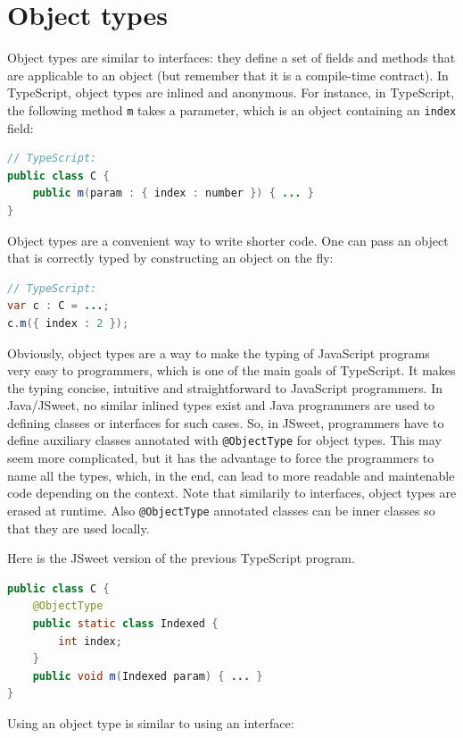 \documentclass[a4paper]{report}
\begin{document}
\section{Object types}

Object types are similar to interfaces: they define a set of fields and methods that are applicable to an object (but remember that it is a compile-time contract). In TypeScript, object types are inlined and anonymous. For instance, in TypeScript, the following method \texttt{m} takes a parameter, which is an object containing an \texttt{index} field:

\begin{lstlisting}[language=Java]
// TypeScript:
public class C {
	public m(param : { index : number }) { ... }
}
\end{lstlisting}

Object types are a convenient way to write shorter code. One can pass an object that is correctly typed by constructing an object on the fly:

\begin{lstlisting}[language=Java]
// TypeScript:
var c : C = ...;
c.m({ index : 2 });
\end{lstlisting}

Obviously, object types are a way to make the typing of JavaScript programs very easy to programmers, which is one of the main goals of TypeScript. It makes the typing concise, intuitive and straightforward to JavaScript programmers. In Java/JSweet, no similar inlined types exist and Java programmers are used to defining classes or interfaces for such cases. So, in JSweet, programmers have to define auxiliary classes annotated with \texttt{@ObjectType} for object types. This may seem more complicated, but it has the advantage to force the programmers to name all the types, which, in the end, can lead to more readable and maintenable code depending on the context. Note that similarily to interfaces, object types are erased at runtime. Also \texttt{@ObjectType} annotated classes can be inner classes so that they are used locally.

Here is the JSweet version of the previous TypeScript program.

\begin{lstlisting}[language=Java]
public class C {
	@ObjectType
	public static class Indexed {
		int index;
	}
	public void m(Indexed param) { ... }
}
\end{lstlisting}

Using an object type is similar to using an interface:
\end{document}

